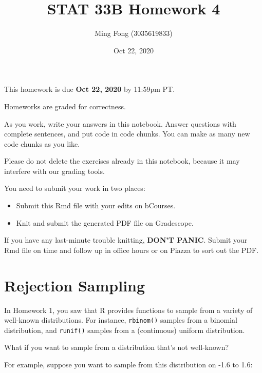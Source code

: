 \documentclass[
]{article}
\title{STAT 33B Homework 4}
\author{Ming Fong (3035619833)}
\date{Oct 22, 2020}
\providecommand{\tightlist}{%
  \setlength{\itemsep}{0pt}\setlength{\parskip}{0pt}}
\begin{document}
\maketitle

This homework is due \textbf{Oct 22, 2020} by 11:59pm PT.

Homeworks are graded for correctness.

As you work, write your answers in this notebook. Answer questions with
complete sentences, and put code in code chunks. You can make as many
new code chunks as you like.

Please do not delete the exercises already in this notebook, because it
may interfere with our grading tools.

You need to submit your work in two places:

\begin{itemize}
\tightlist
\item
  Submit this Rmd file with your edits on bCourses.
\item
  Knit and submit the generated PDF file on Gradescope.
\end{itemize}

If you have any last-minute trouble knitting, \textbf{DON'T PANIC}.
Submit your Rmd file on time and follow up in office hours or on Piazza
to sort out the PDF.

\hypertarget{rejection-sampling}{%
\section{Rejection Sampling}\label{rejection-sampling}}

In Homework 1, you saw that R provides functions to sample from a
variety of well-known distributions. For instance, \texttt{rbinom()}
samples from a binomial distribution, and \texttt{runif()} samples from
a (continuous) uniform distribution.

What if you want to sample from a distribution that's not well-known?

For example, suppose you want to sample from this distribution on -1.6
to 1.6:
\end{document}
